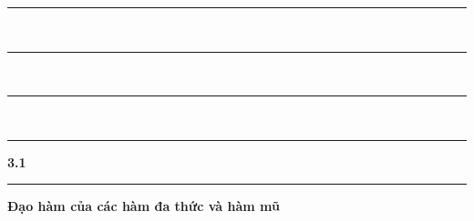 \noindent
\begin{minipage}[c]{0.26\textwidth}
  \begin{minipage}[c]{0.42\linewidth}
    \color{stewartlightblue}
    \rule{\linewidth}{0.8pt}\\[3.5pt]
    \rule{\linewidth}{0.8pt}\\[3.5pt]
    \rule{\linewidth}{0.8pt}\\[3.5pt]
    \rule{\linewidth}{0.8pt}
  \end{minipage}\hfill
  \begin{minipage}[c]{0.52\linewidth}
    \raggedleft
    \fontsize{28}{28}\selectfont\bfseries\sffamily\color{stewartblue} 3.1
  \end{minipage}
\end{minipage}%
\hspace{8pt}%
{\color{stewartblue}\rule[-7pt]{2.5pt}{30pt}}%
\hspace{10pt}%
\begin{minipage}[c]{0.69\textwidth}
  \raggedright
  \fontsize{16.5}{20}\selectfont\bfseries\sffamily\color{stewartdark}%
  Đạo hàm của các hàm đa thức và hàm mũ
\end{minipage}

\vspace{14pt}

